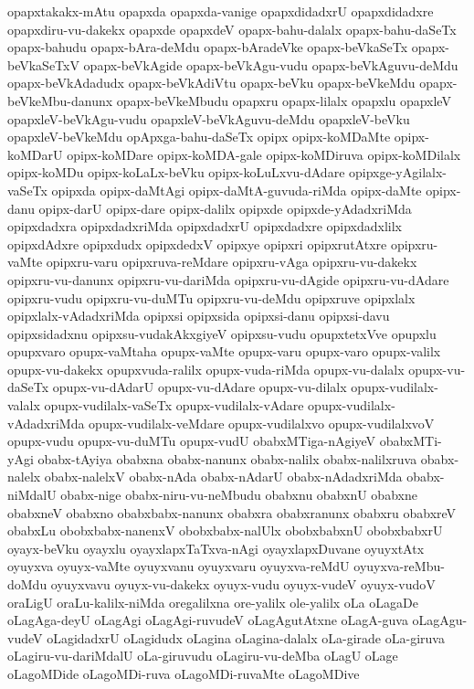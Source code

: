 {opapxtakakx-mAtu
opapxda
opapxda-vanige
opapxdidadxrU
opapxdidadxre
opapxdiru-vu-dakekx
opapxde
opapxdeV
opapx-bahu-dalalx
opapx-bahu-daSeTx
opapx-bahudu
opapx-bAra-deMdu
opapx-bAradeVke
opapx-beVkaSeTx
opapx-beVkaSeTxV
opapx-beVkAgide
opapx-beVkAgu-vudu
opapx-beVkAguvu-deMdu
opapx-beVkAdadudx
opapx-beVkAdiVtu
opapx-beVku
opapx-beVkeMdu
opapx-beVkeMbu-danunx
opapx-beVkeMbudu
opapxru
opapx-lilalx
opapxlu
opapxleV
opapxleV-beVkAgu-vudu
opapxleV-beVkAguvu-deMdu
opapxleV-beVku
opapxleV-beVkeMdu
opApxga-bahu-daSeTx
opipx
opipx-koMDaMte
opipx-koMDarU
opipx-koMDare
opipx-koMDA-gale
opipx-koMDiruva
opipx-koMDilalx
opipx-koMDu
opipx-koLaLx-beVku
opipx-koLuLxvu-dAdare
opipxge-yAgilalx-vaSeTx
opipxda
opipx-daMtAgi
opipx-daMtA-guvuda-riMda
opipx-daMte
opipx-danu
opipx-darU
opipx-dare
opipx-dalilx
opipxde
opipxde-yAdadxriMda
opipxdadxra
opipxdadxriMda
opipxdadxrU
opipxdadxre
opipxdadxlilx
opipxdAdxre
opipxdudx
opipxdedxV
opipxye
opipxri
opipxrutAtxre
opipxru-vaMte
opipxru-varu
opipxruva-reMdare
opipxru-vAga
opipxru-vu-dakekx
opipxru-vu-danunx
opipxru-vu-dariMda
opipxru-vu-dAgide
opipxru-vu-dAdare
opipxru-vudu
opipxru-vu-duMTu
opipxru-vu-deMdu
opipxruve
opipxlalx
opipxlalx-vAdadxriMda
opipxsi
opipxsida
opipxsi-danu
opipxsi-davu
opipxsidadxnu
opipxsu-vudakAkxgiyeV
opipxsu-vudu
opupxtetxVve
opupxlu
opupxvaro
opupx-vaMtaha
opupx-vaMte
opupx-varu
opupx-varo
opupx-valilx
opupx-vu-dakekx
opupxvuda-ralilx
opupx-vuda-riMda
opupx-vu-dalalx
opupx-vu-daSeTx
opupx-vu-dAdarU
opupx-vu-dAdare
opupx-vu-dilalx
opupx-vudilalx-valalx
opupx-vudilalx-vaSeTx
opupx-vudilalx-vAdare
opupx-vudilalx-vAdadxriMda
opupx-vudilalx-veMdare
opupx-vudilalxvo
opupx-vudilalxvoV
opupx-vudu
opupx-vu-duMTu
opupx-vudU
obabxMTiga-nAgiyeV
obabxMTi-yAgi
obabx-tAyiya
obabxna
obabx-nanunx
obabx-nalilx
obabx-nalilxruva
obabx-nalelx
obabx-nalelxV
obabx-nAda
obabx-nAdarU
obabx-nAdadxriMda
obabx-niMdalU
obabx-nige
obabx-niru-vu-neMbudu
obabxnu
obabxnU
obabxne
obabxneV
obabxno
obabxbabx-nanunx
obabxra
obabxranunx
obabxru
obabxreV
obabxLu
obobxbabx-nanenxV
obobxbabx-nalUlx
obobxbabxnU
obobxbabxrU
oyayx-beVku
oyayxlu
oyayxlapxTaTxva-nAgi
oyayxlapxDuvane
oyuyxtAtx
oyuyxva
oyuyx-vaMte
oyuyxvanu
oyuyxvaru
oyuyxva-reMdU
oyuyxva-reMbu-doMdu
oyuyxvavu
oyuyx-vu-dakekx
oyuyx-vudu
oyuyx-vudeV
oyuyx-vudoV
oraLigU
oraLu-kalilx-niMda
oregalilxna
ore-yalilx
ole-yalilx
oLa
oLagaDe
oLagAga-deyU
oLagAgi
oLagAgi-ruvudeV
oLagAgutAtxne
oLagA-guva
oLagAgu-vudeV
oLagidadxrU
oLagidudx
oLagina
oLagina-dalalx
oLa-girade
oLa-giruva
oLagiru-vu-dariMdalU
oLa-giruvudu
oLagiru-vu-deMba
oLagU
oLage
oLagoMDide
oLagoMDi-ruva
oLagoMDi-ruvaMte
oLagoMDive
}
